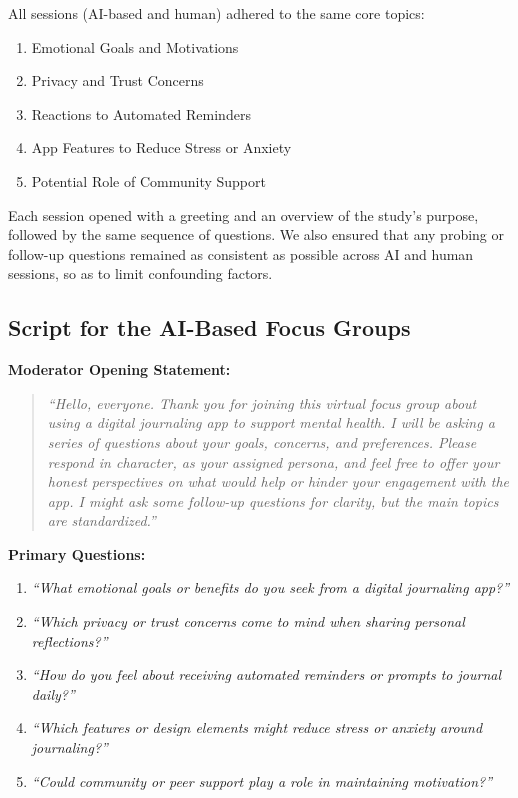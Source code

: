 \documentclass[acmsmall]{acmart}
\begin{document}
All sessions (AI-based and human) adhered to the same core topics:
\begin{enumerate}
    \item Emotional Goals and Motivations
    \item Privacy and Trust Concerns
    \item Reactions to Automated Reminders
    \item App Features to Reduce Stress or Anxiety
    \item Potential Role of Community Support
\end{enumerate}

Each session opened with a greeting and an overview of the study’s purpose, followed by the same sequence of questions. We also ensured that any probing or follow-up questions remained as consistent as possible across AI and human sessions, so as to limit confounding factors.

\subsection{Script for the AI-Based Focus Groups}

\noindent
\textbf{Moderator Opening Statement:}
\begin{quote}
\emph{``Hello, everyone. Thank you for joining this virtual focus group about using a digital journaling app to support mental health. 
I will be asking a series of questions about your goals, concerns, and preferences. 
Please respond in character, as your assigned persona, and feel free to offer your honest perspectives on what would help or hinder your engagement with the app. 
I might ask some follow-up questions for clarity, but the main topics are standardized.''}
\end{quote}

\noindent
\textbf{Primary Questions:}
\begin{enumerate}
    \item \emph{``What emotional goals or benefits do you seek from a digital journaling app?''}
    \item \emph{``Which privacy or trust concerns come to mind when sharing personal reflections?''}
    \item \emph{``How do you feel about receiving automated reminders or prompts to journal daily?''}
    \item \emph{``Which features or design elements might reduce stress or anxiety around journaling?''}
    \item \emph{``Could community or peer support play a role in maintaining motivation?''}
\end{enumerate}
\end{document}
